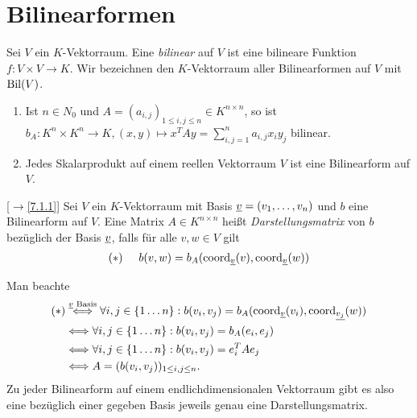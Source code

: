 \documentclass[../../main.tex]{subfiles}
\begin{document}
\section{Bilinearformen}

\begin{df}\label{13.3.1}
	Sei $V$ ein $K$-Vektorraum. Eine \emph{bilinear} auf $V$ ist eine bilineare Funktion $f: V\times V\to K$. Wir bezeichnen den $K$-Vektorraum aller Bilinearformen auf $V$ mit $\operatorname{Bil}(V)$.
\end{df}

\begin{bsp}\label{13.3.2}
	\begin{enumerate}[\normalfont(a)]
		\item Ist $n\in N_0$ und $A=(a_{i,j})_{1\le i,j\le n}\in K^{n\times n}$, so ist $b_A: K^n\times K^n\to K, (x,y)\mapsto x^TAy=\sum_{i,j=1}^na_{i,j}x_iy_j$ bilinear.
		\item Jedes Skalarprodukt auf einem reellen Vektorraum $V$ ist eine Bilinearform auf $V$.
	\end{enumerate}
\end{bsp}
	
\begin{df}\label{13.3.3} 
	[$\to$\ref{7.1.1}] Sei $V$ ein $K$-Vektorraum mit Basis ${\underline v}=(v_1,\ldots ,v_n)$ und $b$ eine Bilinearform auf $V$. Eine Matrix $A\in K^{n\times n}$ heißt \emph{Darstellungsmatrix} von $b$ bezüglich der Basis ${\underline v}$, falls für alle $v,w\in V$ gilt
	\begin{align*}
		(*)\hspace{0.5cm} b(v,w)=b_A(\operatorname{coord}_{{\underline v}}(v),\operatorname{coord}_{{\underline v}}(w))
	\end{align*}
\end{df}

\begin{bem}\label{13.3.4} 
	Man beachte
	\begin{align*}
		(*)&\stackrel{\underline{v}\text{ Basis}}{\Longleftrightarrow} \forall i,j\in \{1\ldots n\}: b(v_i,v_j)=b_A(\operatorname{coord}_{\underline{v}}(v_i),\operatorname{coord}_{\underline{v_j}}(w))\\
		&\Longleftrightarrow \forall i,j\in \{1\ldots n\}: b(v_i,v_j)=b_A(e_i,e_j)\\
		&\Longleftrightarrow \forall i,j\in \{1\ldots n\}: b(v_i,v_j)=e_i^TAe_j\\
		&\Longleftrightarrow A=(b(v_i,v_j))_{1\le i,j\le n}.
	\end{align*}
	Zu jeder Bilinearform auf einem endlichdimensionalen Vektorraum gibt es also eine bezüglich einer gegeben Basis jeweils genau eine Darstellungsmatrix.
\end{bem}
	
\end{document}
